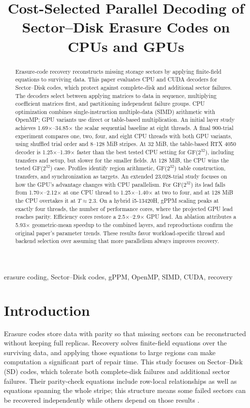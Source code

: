 \documentclass[conference]{IEEEtran}
\title{Cost-Selected Parallel Decoding of Sector--Disk Erasure Codes on CPUs and GPUs}
\author{\IEEEauthorblockN{Tejas Singh Sodhi, Arnav Verma, Advay Satish, and Dhanush Kumar}
\IEEEauthorblockA{Birla Institute of Technology and Science, Pilani\\
K K Birla Goa Campus, Goa, India}}
\begin{document}
\maketitle

\begin{abstract}
Erasure-code recovery reconstructs missing storage sectors by applying finite-field equations to surviving data. This paper evaluates CPU and CUDA decoders for Sector--Disk codes, which protect against complete-disk and additional sector failures. The decoders select between applying matrices to data in sequence, multiplying coefficient matrices first, and partitioning independent failure groups. CPU optimization combines single-instruction multiple-data (SIMD) arithmetic with OpenMP; GPU variants use direct or table-based multiplication. An initial layer study achieves 1.69$\times$--34.85$\times$ the scalar sequential baseline at eight threads. A final 900-trial experiment compares one, two, four, and eight CPU threads with both GPU variants, using shuffled trial order and 8--128 MiB stripes. At 32 MiB, the table-based RTX 4050 decoder is 1.25$\times$--1.39$\times$ faster than the best tested CPU setting for GF($2^{32}$), including transfers and setup, but slower for the smaller fields. At 128 MiB, the CPU wins the tested GF($2^{32}$) case. Profiles identify region arithmetic, GF($2^{32}$) table construction, transfers, and synchronization as targets. An extended 23,028-trial study focuses on how the GPU's advantage changes with CPU parallelism. For GF($2^{32}$) its lead falls from 1.70$\times$--2.12$\times$ at one CPU thread to 1.25$\times$--1.40$\times$ at two to four, and at 128 MiB the CPU overtakes it at $T\approx2.3$. On a hybrid i5-13420H, gPPM scaling peaks at exactly four threads, the number of performance cores, where the projected GPU lead reaches parity. Efficiency cores restore a 2.5$\times$--2.9$\times$ GPU lead. An ablation attributes a 5.93$\times$ geometric-mean speedup to the combined layers, and reproductions confirm the original paper's parameter trends. These results favor workload-specific thread and backend selection over assuming that more parallelism always improves recovery.
\end{abstract}

\begin{IEEEkeywords}
erasure coding, Sector--Disk codes, gPPM, OpenMP, SIMD, CUDA, recovery
\end{IEEEkeywords}

\section{Introduction}
Erasure codes store data with parity so that missing sectors can be reconstructed without keeping full replicas. Recovery solves finite-field equations over the surviving data, and applying those equations to large regions can make computation a significant part of repair time. This study focuses on Sector--Disk (SD) codes, which tolerate both complete-disk failures and additional sector failures. Their parity-check equations include row-local relationships as well as equations spanning the whole stripe; this structure means some failed sectors can be recovered independently while others depend on those results \cite{li2023gppm}.
\end{document}
